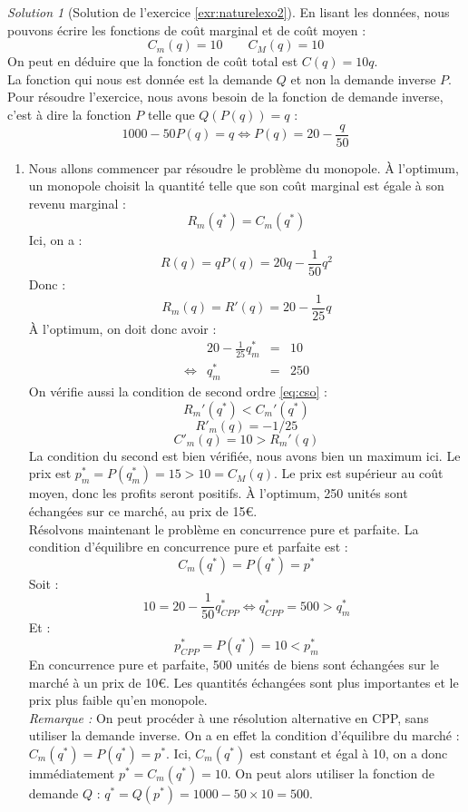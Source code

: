 \documentclass[
]{book}
\providecommand{\tightlist}{%
  \setlength{\itemsep}{0pt}\setlength{\parskip}{0pt}}
\theoremstyle{definition}
\theoremstyle{definition}
\theoremstyle{definition}
\theoremstyle{definition}
\theoremstyle{remark}
\newtheorem*{solution}{Solution}
\begin{document}
\begin{solution}[Solution de l'exercice \ref{exr:naturelexo2}]
En lisant les données, nous pouvons écrire les fonctions de coût marginal et de coût moyen :
\[C_m(q)=10\qquad C_M(q)=10\]
On peut en déduire que la fonction de coût total est \(C(q)=10q\).\\
La fonction qui nous est donnée est la demande \(Q\) et non la demande inverse \(P\).
Pour résoudre l'exercice, nous avons besoin de la fonction de demande inverse, c'est à dire la fonction \(P\) telle que \(Q(P(q))=q\) :
\[1000-50P(q)=q \Leftrightarrow P(q) = 20-\frac{q}{50}\]

\begin{enumerate}
\def\labelenumi{\arabic{enumi}.}
\tightlist
\item
  Nous allons commencer par résoudre le problème du monopole.
  À l'optimum, un monopole choisit la quantité telle que son coût marginal est égale à son revenu marginal :
  \[R_m(q^*)=C_m(q^*)\]
  Ici, on a :
  \[R(q) =qP(q)=20q-\frac{1}{50}q^2\]
  Donc :
  \[R_m(q)=R'(q)=20-\frac{1}{25}q\]
  À l'optimum, on doit donc avoir :
  \[
  \begin{array}{crcl}
  &20-\frac{1}{25}q^*_m&=&10\\
  \Leftrightarrow & q^*_m&=&250
  \end{array}
  \]
  On vérifie aussi la condition de second ordre \eqref{eq:cso} :
  \[R_m'(q^*)<C_m'(q^*)\]
  \[R'_m(q)=-1/25\]
  \[C'_m(q)=10>R_m'(q)\]
  La condition du second est bien vérifiée, nous avons bien un maximum ici.
  Le prix est \(p^*_m=P(q^*_m)=15>10=C_M(q)\).
  Le prix est supérieur au coût moyen, donc les profits seront positifs.
  À l'optimum, 250 unités sont échangées sur ce marché, au prix de 15€.\\
  Résolvons maintenant le problème en concurrence pure et parfaite.
  La condition d'équilibre en concurrence pure et parfaite est :
  \[C_m(q^*)=P(q^*)=p^*\]
  Soit :
  \[10=20-\frac{1}{50}q^*_{CPP}\Leftrightarrow q^*_{CPP}=500>q_m^*\]
  Et :
  \[p^*_{CPP}=P(q^*)=10<p_m^*\]
  En concurrence pure et parfaite, 500 unités de biens sont échangées sur le marché à un prix de 10€.
  Les quantités échangées sont plus importantes et le prix plus faible qu'en monopole.\\
  \emph{Remarque :} On peut procéder à une résolution alternative en CPP, sans utiliser la demande inverse.
  On a en effet la condition d'équilibre du marché : \(C_m(q^*)=P(q^*)=p^*\).
  Ici, \(C_m(q^*)\) est constant et égal à 10, on a donc immédiatement \(p^*=C_m(q^*)=10\).
  On peut alors utiliser la fonction de demande \(Q\) : \(q^*=Q(p^*)=1000-50\times10=500\).

\end{enumerate}
\end{solution}
\end{document}
